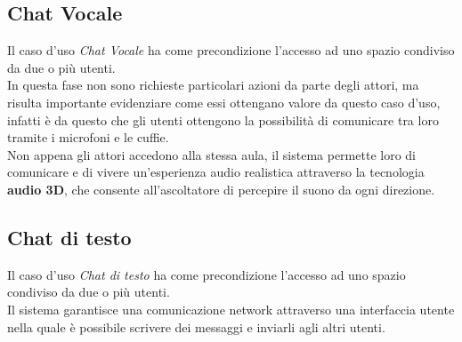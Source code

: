 \subsection{Chat Vocale}
Il caso d'uso \textit{Chat Vocale} ha come precondizione l'accesso ad uno spazio condiviso da due o più utenti. \\In questa fase non sono richieste particolari azioni da parte degli attori, ma risulta importante evidenziare come essi ottengano valore da questo caso d'uso, infatti è da questo che gli utenti ottengono la possibilità di comunicare tra loro tramite i microfoni e le cuffie.
\\Non appena gli attori accedono alla stessa aula, il sistema permette loro di comunicare e di vivere un'esperienza audio realistica attraverso la tecnologia \textbf{audio 3D}, che consente all'ascoltatore di percepire il suono da ogni direzione.
\subsection{Chat di testo}
Il caso d'uso \textit{Chat di testo} ha come precondizione l'accesso ad uno spazio condiviso da due o più utenti.
\\Il sistema garantisce una comunicazione network attraverso una interfaccia utente nella quale è possibile scrivere dei messaggi e inviarli agli altri utenti.
